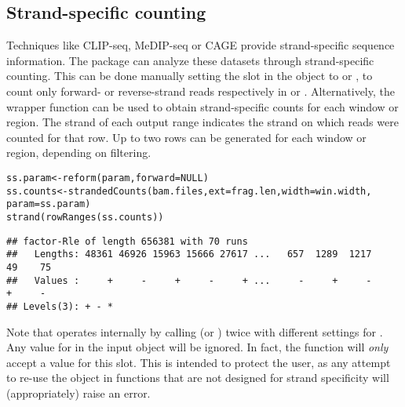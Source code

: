 \documentclass{report}\usepackage[]{graphicx}\usepackage[usenames,dvipsnames]{color}
\newcommand{\hlstd}[1]{\textcolor[rgb]{0.251,0.251,0.251}{#1}}%
\newcommand{\hlkwa}[1]{\textcolor[rgb]{0.125,0.125,0.941}{#1}}%
\newcommand{\hlkwb}[1]{\textcolor[rgb]{0,0,0}{#1}}%
\newcommand{\hlkwc}[1]{\textcolor[rgb]{0.251,0.251,0.251}{#1}}%
\newcommand{\hlkwd}[1]{\textcolor[rgb]{0.878,0.439,0.125}{#1}}%
\newenvironment{knitrout}{}{} %
\begin{document}
\subsection{Strand-specific counting}
Techniques like CLIP-seq, MeDIP-seq or CAGE provide strand-specific sequence information.
The  package can analyze these datasets through strand-specific counting.
This can be done manually setting the  slot in the  object to  or , to count only forward- or reverse-strand reads respectively in  or .
Alternatively, the  wrapper function can be used to obtain strand-specific counts for each window or region.
The strand of each output range indicates the strand on which reads were counted for that row.
Up to two rows can be generated for each window or region, depending on filtering.

\begin{knitrout}
\color{fgcolor}\begin{kframe}
\begin{alltt}
\hlstd{ss.param} \hlkwb{<-} \hlkwd{reform}\hlstd{(param,} \hlkwc{forward}\hlstd{=}\hlkwa{NULL}\hlstd{)}
\hlstd{ss.counts} \hlkwb{<-} \hlkwd{strandedCounts}\hlstd{(bam.files,} \hlkwc{ext}\hlstd{=frag.len,} \hlkwc{width}\hlstd{=win.width,}
                            \hlkwc{param}\hlstd{=ss.param)}
\hlkwd{strand}\hlstd{(}\hlkwd{rowRanges}\hlstd{(ss.counts))}
\end{alltt}
\begin{verbatim}
## factor-Rle of length 656381 with 70 runs
##   Lengths: 48361 46926 15963 15666 27617 ...   657  1289  1217    49    75
##   Values :     +     -     +     -     + ...     -     +     -     +     -
## Levels(3): + - *
\end{verbatim}
\end{kframe}
\end{knitrout}

Note that  operates internally by calling  (or ) twice with different settings for . 
Any value for  in the input  object will be ignored.
In fact, the function will \textit{only} accept a  value for this slot.
This is intended to protect the user, as any attempt to re-use the  object in functions that are not designed for strand specificity will (appropriately) raise an error.
\end{document}
